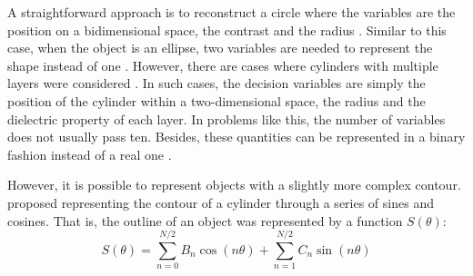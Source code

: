 			A straightforward approach is to reconstruct a circle where the variables are the position on a bidimensional space, the contrast and the radius \citep{michalski2000electromagnetic}. Similar to this case, when the object is an ellipse, two variables are needed to represent the shape instead of one \citep{michalski2001electromagnetic}. However, there are cases where cylinders with multiple layers were considered \citep{kent1997dielectric,caorsi2003detection,pastorino2007stochastic,michalski2000electromagnetic}. In such cases, the decision variables are simply the position of the cylinder within a two-dimensional space, the radius and the dielectric property of each layer. In problems like this, the number of variables does not usually pass ten. Besides, these quantities can be represented in a binary fashion instead of a real one \citep{kent1997dielectric}.
			
			However, it is possible to represent objects with a slightly more complex contour. \cite{chiu1996image} proposed representing the contour of a cylinder through a series of sines and cosines. That is, the outline of an object was represented by a function $S(\theta)$:
			\begin{equation}
				S(\theta) = \sum\limits_{n=0}^{N/2} B_n\cos(n\theta) + \sum\limits_{n=1}^{N/2} C_n\sin(n\theta) \label{eq:3:stochastic:representation:0}
			\end{equation}
		
